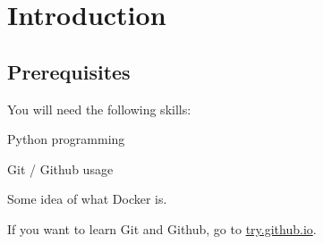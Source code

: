 
\section{Introduction}

\subsection{Prerequisites}

You will need the following skills:

\begin{compactitem}
  \item Python programming
  \item Git / Github usage
  \item Some idea of what Docker is.
\end{compactitem}


If you want to learn Git and Github, go to \href{https://try.github.io/}{try.github.io}.


